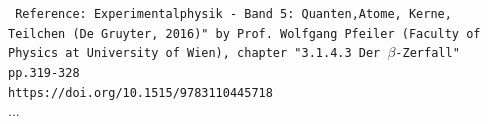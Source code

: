 \texttt{
	Reference: Experimentalphysik - Band 5: Quanten,Atome, Kerne, Teilchen (De Gruyter, 2016)" by Prof. Wolfgang Pfeiler (Faculty of Physics at University of Wien), chapter "3.1.4.3 Der $\beta$-Zerfall" pp.319-328 
	\\
	https://doi.org/10.1515/9783110445718
} \\

...


